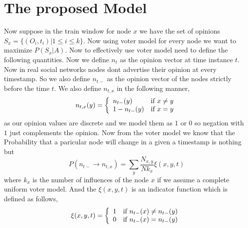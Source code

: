 \section*{The proposed Model}
Now suppose in the train window for node $x$ we have the set of opinions $S_{x} = \{(O_{i},t_{i})|1 \leq i \leq k\}$. Now using voter model for every node we want to maximize $P(S_{x}|A)$. Now to effectively use voter model need to define the following quantities. Now we define $n_{t}$ as the opinion vector at time instance $t$. Now in real social networks nodes dont advertise their opinion at every timestamp. So we also define $n_{t-}$ as the opinion vector of the nodes strictly before the time $t$. We also define $n_{t,x}$ in the following manner,
\begin{equation}
n_{t,x} (y) = \left\{ \begin{array}{ll} n_{t-} (y) & \mbox{if } x \neq y \\ 1-{n_{t-} (y)} & \mbox{if } x = y \end{array} \right.
\end{equation}
as our opinion values are discrete and we model them as $1$ or $0$ so negation with $1$ just complements the opinion. Now from the voter model we know that the Probability that a paricular node will change in a given a timestamp is nothing but
\begin{equation}
P(n_{t-} \rightarrow n_{t,x}) = \displaystyle\sum_{y} \frac{N_{x,y}}{Nk_{x}} \xi (x,y,t)
\end{equation}
where $k_{x}$ is the number of influences of the node $x$ if we assume a complete uniform voter model. Ansd the $\xi(x,y,t)$ is an indicator function which is defined as follows,
\begin{equation}
\xi(x,y,t) = \left\{ \begin{array}{ll} 1 & \mbox{if } n_{t-}(x) \neq n_{t-}(y) \\ 0 & \mbox{if } n_{t-}(x) = n_{t-}(y) \end{array} \right.
\end{equation}
